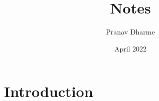 \documentclass{article}
\title{Notes}
\author{Pranav Dharme}
\date{April 2022}
\begin{document}
\maketitle

\section{Introduction}
\end{document}
